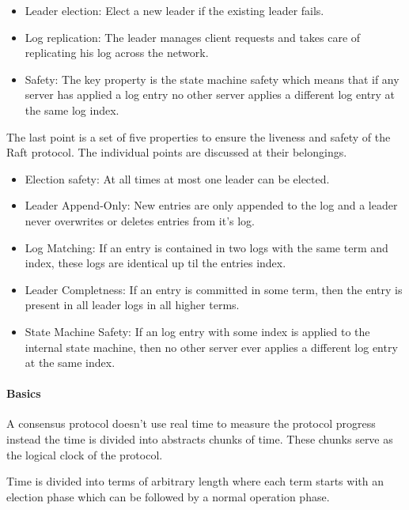 \begin{itemize}
\item Leader election: Elect a new leader if the existing leader fails.
\item Log replication: The leader manages client requests and takes care
  of replicating his log across the network.
\item Safety:  The key property is the state machine safety which means that
  if any server has applied a log entry no other server applies a
  different log entry at the same log index.
\end{itemize}

The last point is a set of five properties to ensure the liveness and
safety of the Raft protocol. The individual points are discussed at
their belongings.~\cite{ongaro2014search}

\begin{itemize}
\item Election safety: At all times at most one leader can be elected.
\item Leader Append-Only: New entries are only appended to the log and
  a leader never overwrites or deletes entries from it's log.
\item Log Matching: If an entry is contained in two logs with the same
  term and index, these logs are identical up til the entries index.
\item Leader Completness: If an entry is committed in some term, then the
  entry is present in all leader logs in all higher terms.
\item State Machine Safety: If an log entry with some index is applied to
  the internal state machine, then no other server ever applies a
  different log entry at the same index.
\end{itemize}

\paragraph{Basics}
A consensus protocol doesn't use real time to measure the protocol progress
instead the time is divided into abstracts chunks of time. These chunks
serve as the logical clock of the protocol.~\cite{ongaro2014search}

\begin{defi}
  Time is divided into terms of arbitrary length where each term
  starts with an election phase which can be followed by a normal
  operation phase.
\end{defi}

